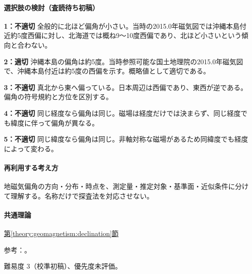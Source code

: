 \paragraph{選択肢の検討（査読待ち初稿）}\mbox{}\par

\noindent\textbf{1：不適切} 全般的に北ほど偏角が小さい。当時の2015.0年磁気図では沖縄本島付近約5度西偏に対し、北海道では概ね9〜10度西偏であり、北ほど小さいという傾向と合わない。\par

\noindent\textbf{2：適切} 沖縄本島の偏角は約5度。当時参照可能な国土地理院の2015.0年磁気図で、沖縄本島付近は約5度の西偏を示す。概略値として適切である。\par

\noindent\textbf{3：不適切} 真北から東へ偏っている。日本周辺は西偏であり、東西が逆である。偏角の符号規約と方位を区別する。\par

\noindent\textbf{4：不適切} 同じ経度なら偏角は同じ。磁場は経度だけでは決まらず、同じ経度でも緯度に伴って偏角が異なる。\par

\noindent\textbf{5：不適切} 同じ緯度なら偏角は同じ。非軸対称な磁場があるため同緯度でも経度によって変わる。\par

\paragraph{再利用する考え方} 地磁気偏角の方向・分布・時点を、測定量・推定対象・基準面・近似条件に分けて理解する。名称だけで探査法を対応させない。

\paragraph{共通理論} \hyperref[theory:geomagnetism:declination]{第\ref*{theory:geomagnetism:declination}節}

\par 参考：\cite{gsi_declination2015}。

\par 難易度 3（校準初稿）、優先度未評価。
